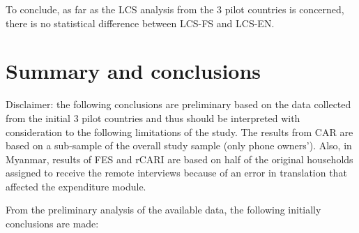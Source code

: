\documentclass[11pt,harvard]{article}
\begin{document}
	To conclude, as far as the LCS analysis from the 3 pilot countries is concerned, there is no statistical difference between LCS-FS and LCS-EN.
	
	
	\pagebreak
	
	
\section{Summary and conclusions}
	
Disclaimer: the following conclusions are preliminary based on the data collected from the initial 3 pilot countries and thus should be interpreted with consideration to the following limitations of the study. The results from CAR are based on a sub-sample of the overall study sample (only phone owners’). Also, in Myanmar, results of FES and rCARI are based on half of the original households assigned to receive the remote interviews because of an error in translation that affected the expenditure module.
	
From the preliminary analysis of the available data, the following initially conclusions are made: 
	
\end{document}

